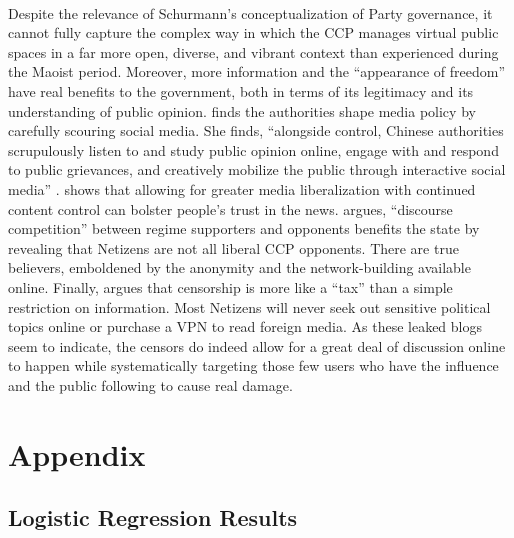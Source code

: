 \documentclass[12pt]{article}
\begin{document}
\begin{CJK*}{UTF8}{gbsn}
\paragraph{} Despite the relevance of Schurmann's conceptualization of Party governance, it cannot fully capture the complex way in which the CCP manages virtual public spaces in a far more open, diverse, and vibrant context than experienced during the Maoist period. Moreover, more information and the ``appearance of freedom'' have real benefits to the government, both in terms of its legitimacy and its understanding of public opinion. \cite{repnikova2017media} finds the authorities shape media policy by carefully scouring social media. She finds, ``alongside control, Chinese authorities scrupulously listen to and study public opinion online, engage with and respond to public grievances, and creatively mobilize the public through interactive social media'' \citep{repnikova2018china}. \cite{stockmann2013media} shows that allowing for greater media liberalization with continued content control can bolster people's trust in the news. \cite{han2018contesting} argues, ``discourse competition'' between regime supporters and opponents benefits the state by revealing that Netizens are not all liberal CCP opponents. There are true believers, emboldened by the anonymity and the network-building available online. Finally, \cite{roberts2018censored} argues that censorship is more like a ``tax'' than a simple restriction on information. Most Netizens will never seek out sensitive political topics online or purchase a VPN to read foreign media. As these leaked blogs seem to indicate, the censors do indeed allow for a great deal of discussion online to happen while systematically targeting those few users who have the influence and the public following to cause real damage.
\newpage

\section*{Appendix}\label{appendix}

\subsection*{Logistic Regression Results}


\end{CJK*}
\end{document}

